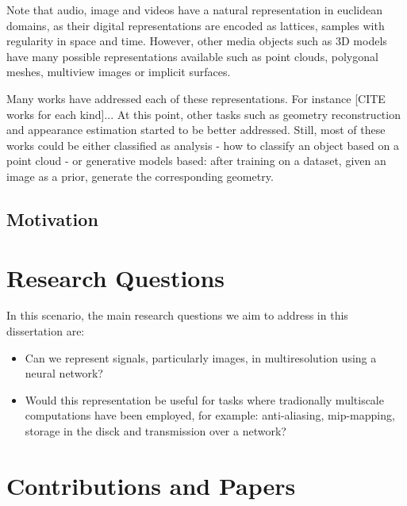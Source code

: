 Note that audio, image and videos have a natural representation in euclidean domains, as their digital representations are encoded as lattices, samples with regularity in space and time. However, other media objects such as 3D models have many possible representations available such as point clouds, polygonal meshes, multiview images or implicit surfaces.



Many works have addressed each of these representations. For instance [CITE works for each kind]... At this point, other tasks such as geometry reconstruction and appearance estimation started to be better addressed. Still, most of these works could be either classified as analysis - how to classify an object based on a point cloud - or generative models based: after training on a dataset, given an image as a prior, generate the corresponding geometry.

\subsection{Motivation}




\section{Research Questions}

In this scenario, the main research questions we aim to address in this dissertation are:

\begin{itemize}
    \item Can we represent signals, particularly images, in multiresolution using a neural network?
    \item Would this representation be useful for tasks where tradionally multiscale computations have been employed, for example: anti-aliasing, mip-mapping, storage in the disck and transmission over a network?
\end{itemize}  

\section{Contributions and Papers}

